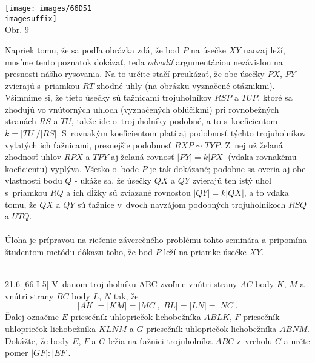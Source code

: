 \rieh
\begin{center}
\texttt{[image: images/66D51\\imagesuffix]}\\

Obr. 9
\end{center}
Napriek tomu, že sa podľa obrázka zdá, že bod $P$ na úsečke $XY$ naozaj leží, musíme tento poznatok dokázať, teda \textit{odvodiť} argumentáciou nezávislou na presnosti nášho rysovania. Na to určite stačí preukázať, že obe úsečky $PX$, $PY$ zvierajú s~priamkou $RT$ zhodné uhly (na obrázku vyznačené otáznikmi). Všimnime si, že tieto úsečky sú ťažnicami trojuholníkov $RSP$ a $TUP$, ktoré sa zhodujú vo vnútorných uhloch (vyznačených oblúčikmi) pri rovnobežných stranách $RS$ a $TU$, takže ide o~trojuholníky podobné, a to s~koeficientom $k = |TU|/|RS|$. S~rovnakým koeficientom platí aj podobnosť  týchto trojuholníkov vyťatých ich ťažnicami, presnejšie podobnosť $RXP \sim TYP$. Z~nej už želaná zhodnosť uhlov $RPX$ a $TPY$ aj želaná rovnosť $|PY | = k|PX|$ (vďaka rovnakému koeficientu) vyplýva. Všetko o~bode $P$ je tak dokázané; podobne sa overia aj obe vlastnosti bodu $Q$ - ukáže sa, že úsečky $QX$ a $QY$ zvierajú ten istý uhol s~priamkou $RQ$ a ich dĺžky sú zviazané rovnosťou $|QY | = k|QX|$, a to vďaka tomu, že $QX$ a $QY$ sú ťažnice v~dvoch navzájom podobných trojuholníkoch $RSQ$ a $UTQ$.\\
\\
\kom Úloha je prípravou na riešenie záverečného problému tohto seminára a pripomína študentom metódu dôkazu toho, že bod $P$ leží na priamke úsečke $XY$.\\
\\
\begin{tcolorbox}[breakable,notitle,boxrule=0pt,colback=light-gray,colframe=light-gray]\ul{21.6} [66-I-5] V~danom trojuholníku ABC zvoľme vnútri strany $AC$ body $K$, $M$ a vnútri strany $BC$ body $L$, $N$ tak, že
$$|AK| = |KM| = |MC|, |BL| = |LN| = |NC|.$$
Ďalej označme $E$ priesečník uhlopriečok lichobežníka $ABLK$, $F$ priesečník uhlopriečok lichobežníka $KLNM$ a $G$ priesečník uhlopriečok lichobežníka $ABNM$. Dokážte, že body $E$, $F$ a $G$ ležia na ťažnici trojuholníka $ABC$ z~vrcholu $C$ a určte pomer $|GF| : |EF|$.

\end{tcolorbox}


